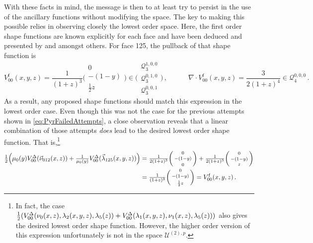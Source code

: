 With these facts in mind, the message is then to at least try to persist in the use of the ancillary functions without modifying the space.
The key to making this possible relies in observing closely the lowest order space.
Here, the first order shape functions are known explicitly for each face and have been deduced and presented by \citet{Hiptmair99} and \citet{Nigam_Phillips_11} amongst others.
For face 125, the pullback of that shape function is
\begin{equation}
	V_{00}^\mathrm{f}(x,y,z)=\textstyle{\frac{1}{(1+z)^3}}\bigg(\begin{smallmatrix}0\\[2pt]-(1-y)\\[2pt]\frac{1}{2}z\end{smallmatrix}\bigg)
			\in\Bigg(\begin{smallmatrix}\mathcal{Q}_{3}^{1,0,0}\\[2pt]\mathcal{Q}_{3}^{0,1,0}\\[2pt]
				\mathcal{Q}_{3}^{0,0,1}\end{smallmatrix}\Bigg)\,,\quad\qquad
	\nabla\!\cdot\!V_{00}^\mathrm{f}(x,y,z)=\textstyle{\frac{3}{2(1+z)^4}}\in\mathcal{Q}_{4}^{0,0,0}\,.
\end{equation}
As a result, any proposed shape functions should match this expression in the lowest order case.
Even though this was not the case for the previous attempts shown in \eqref{eq:PyrFailedAttempts}, a close observation reveals that a linear combination of those attempts \textit{does} lead to the desired lowest order shape function. 
That is,\footnote{In fact, the case $\frac{1}{2}(V_{00}^\Delta(\nu_0(x,z),\lambda_2(x,y,z),\lambda_5(z))+V_{00}^\Delta(\lambda_1(x,y,z),\nu_1(x,z),\lambda_5(z)))$ also gives the desired lowest order shape function. However, the higher order version of this expression unfortunately is not in the space $\mathcal{U}^{(2),p}$.}
\begin{equation}
\begin{aligned}
	\textstyle{\frac{1}{2}}\Big(\mu_0(y)V_{00}^\Delta(\vec{\nu}_{012}(x,z))
		+\textstyle{\frac{1}{\mu_0(y)}}V_{00}^\Delta(\vec{\lambda}_{125}(x,y,z))\Big)
			&=\textstyle{\frac{1}{2(1+z)^3}}\bigg(\begin{smallmatrix}0\\[2pt]-(1-y)\\[2pt]0\end{smallmatrix}\bigg)
				+\textstyle{\frac{1}{2(1+z)^3}}\bigg(\begin{smallmatrix}0\\[2pt]-(1-y)\\[2pt]z\end{smallmatrix}\bigg)\\
	&=\textstyle{\frac{1}{(1+z)^3}}\bigg(\begin{smallmatrix}0\\[2pt]-(1-y)\\[2pt]\frac{1}{2}z\end{smallmatrix}\bigg)
		=V_{00}^\mathrm{f}(x,y,z)\,.
\end{aligned}
\end{equation}
